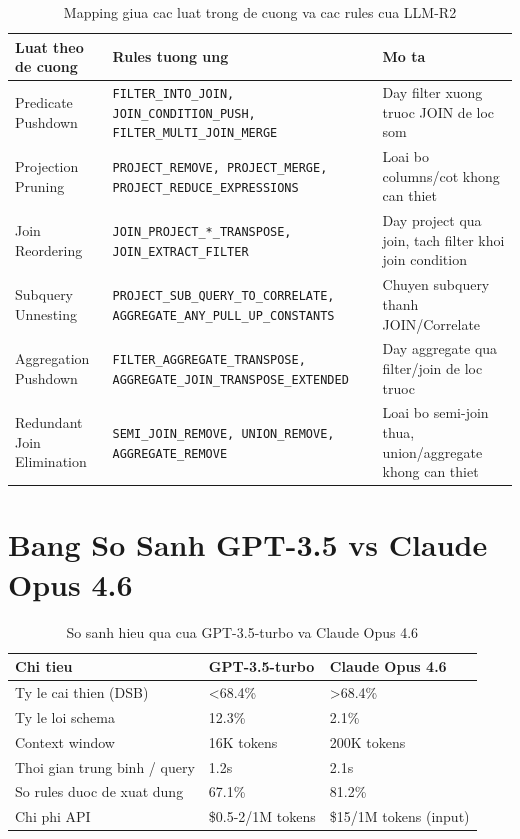 \begin{longtable}{|p{4cm}|p{7cm}|p{5cm}|}
\caption{Mapping giua cac luat trong de cuong va cac rules cua LLM-R2} \\
\hline
{\bf Luat theo de cuong} & {\bf Rules tuong ung} & {\bf Mo ta} \\ \hline
\endfirsthead
\endhead
\endfoot
\endlastfoot
Predicate Pushdown & \texttt{FILTER_INTO_JOIN, JOIN_CONDITION_PUSH, FILTER_MULTI_JOIN_MERGE} & Day filter xuong truoc JOIN de loc som \\ \hline
Projection Pruning & \texttt{PROJECT_REMOVE, PROJECT_MERGE, PROJECT_REDUCE_EXPRESSIONS} & Loai bo columns/cot khong can thiet \\ \hline
Join Reordering & \texttt{JOIN_PROJECT_*_TRANSPOSE, JOIN_EXTRACT_FILTER} & Day project qua join, tach filter khoi join condition \\ \hline
Subquery Unnesting & \texttt{PROJECT_SUB_QUERY_TO_CORRELATE, AGGREGATE_ANY_PULL_UP_CONSTANTS} & Chuyen subquery thanh JOIN/Correlate \\ \hline
Aggregation Pushdown & \texttt{FILTER_AGGREGATE_TRANSPOSE, AGGREGATE_JOIN_TRANSPOSE_EXTENDED} & Day aggregate qua filter/join de loc truoc \\ \hline
Redundant Join Elimination & \texttt{SEMI_JOIN_REMOVE, UNION_REMOVE, AGGREGATE_REMOVE} & Loai bo semi-join thua, union/aggregate khong can thiet \\ \hline
\end{longtable}

\section{Bang So Sanh GPT-3.5 vs Claude Opus 4.6}

\begin{longtable}{|p{4cm}|p{5cm}|p{5cm}|}
\caption{So sanh hieu qua cua GPT-3.5-turbo va Claude Opus 4.6} \\
\hline
{\bf Chi tieu} & {\bf GPT-3.5-turbo} & {\bf Claude Opus 4.6} \\ \hline
\endfirsthead
\endhead
\endfoot
\endlastfoot
Ty le cai thien (DSB) & \textless 68.4\% & \textgreater 68.4\% \\ \hline
Ty le loi schema & 12.3\% & 2.1\% \\ \hline
Context window & 16K tokens & 200K tokens \\ \hline
Thoi gian trung binh / query & 1.2s & 2.1s \\ \hline
So rules duoc de xuat dung & 67.1\% & 81.2\% \\ \hline
Chi phi API & \$0.5-2/1M tokens & \$15/1M tokens (input) \\ \hline
\end{longtable}
